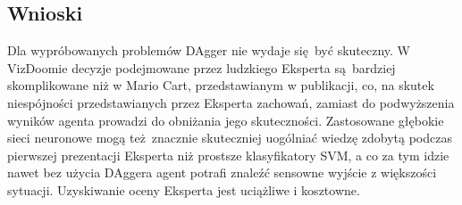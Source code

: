 \subsection{Wnioski}
Dla wypróbowanych problemów DAgger nie wydaje się być skuteczny. W VizDoomie decyzje podejmowane przez ludzkiego Eksperta są bardziej skomplikowane niż w Mario Cart, przedstawianym w publikacji, co, na skutek niespójności przedstawianych przez Eksperta zachowań, zamiast do podwyższenia wyników agenta prowadzi do obniżania jego skuteczności. Zastosowane głębokie sieci neuronowe mogą też znacznie skuteczniej uogólniać wiedzę zdobytą podczas pierwszej prezentacji Eksperta niż prostsze klasyfikatory SVM, a co za tym idzie nawet bez użycia DAggera agent potrafi znaleźć sensowne wyjście z większości sytuacji. Uzyskiwanie oceny Eksperta jest uciążliwe i kosztowne.

